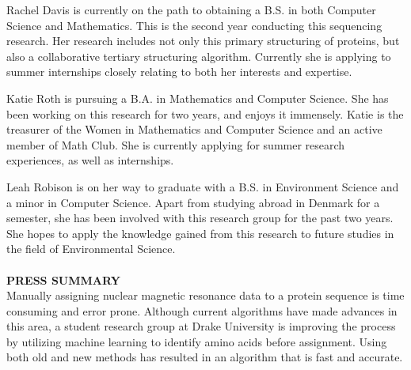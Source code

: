 \documentclass{article}
\begin{document}
\noindent Rachel Davis is currently on the path to obtaining a B.S. in both Computer Science and Mathematics. This is the second year conducting this sequencing research. Her research includes not only this primary structuring of proteins, but also a collaborative tertiary structuring algorithm. Currently she is applying to summer internships closely relating to both her interests and expertise. 

\noindent Katie Roth is pursuing a B.A. in Mathematics and Computer Science. She has been working on this research for two years, and enjoys it immensely. Katie is the treasurer of the Women in Mathematics and Computer Science and an active member of Math Club. She is currently applying for summer research experiences, as well as internships. 

\noindent Leah Robison is on her way to graduate with a B.S. in Environment Science and a minor in Computer Science. Apart from studying abroad in Denmark for a semester, she has been involved with this research group for the past two years. She hopes to apply the knowledge gained from this research to future studies in the field of Environmental Science.
\\\\
\noindent\textbf{PRESS SUMMARY}\\
Manually assigning nuclear magnetic resonance data to a protein sequence is time consuming and error prone. Although current algorithms have made advances in this area, a student research group at Drake University is improving the process by utilizing machine learning to identify amino acids before assignment. Using both old and new methods has resulted in an algorithm that is fast and accurate. 
\end{document}
